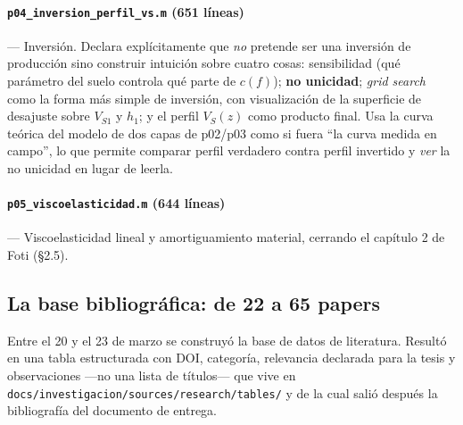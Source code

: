 \paragraph{\texttt{p04\_inversion\_perfil\_vs.m} (651 l\'ineas)} --- Inversi\'on.
Declara expl\'icitamente que \emph{no} pretende ser una inversi\'on de
producci\'on sino construir intuici\'on sobre cuatro cosas: sensibilidad (qu\'e
par\'ametro del suelo controla qu\'e parte de $c(f)$); \textbf{no unicidad};
\emph{grid search} como la forma m\'as simple de inversi\'on, con visualizaci\'on
de la superficie de desajuste sobre $V_{S1}$ y $h_1$; y el perfil $V_S(z)$ como
producto final. Usa la curva te\'orica del modelo de dos capas de p02/p03 como si
fuera ``la curva medida en campo'', lo que permite comparar perfil verdadero
contra perfil invertido y \emph{ver} la no unicidad en lugar de leerla.

\paragraph{\texttt{p05\_viscoelasticidad.m} (644 l\'ineas)} --- Viscoelasticidad
lineal y amortiguamiento material, cerrando el cap\'itulo 2 de Foti (\S2.5).


\subsection{La base bibliogr\'afica: de 22 a 65 papers}

Entre el 20 y el 23 de marzo se construy\'o la base de datos de literatura.
Result\'o en una tabla estructurada con DOI, categor\'ia, relevancia declarada
para la tesis y observaciones ---no una lista de t\'itulos--- que vive en
\texttt{docs/investigacion/sources/research/tables/} y de la cual sali\'o
despu\'es la bibliograf\'ia del documento de entrega.

